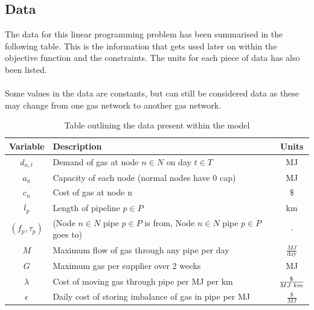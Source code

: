 \documentclass{article}
\begin{document}
\subsection{Data}
\bigskip
The data for this linear programming problem has been summarised in the following table. This is the information that gets used later on within the objective function and the constraints. The units for each piece of data has also been listed. \\
\\
Some values in the data are constants, but can still be considered data as these may change from one gas network to another gas network.
\bigskip
\renewcommand\baselinestretch{1.5}
\begin{table}[h]
    \centering
    \color{black}
        \begin{tabular}{|c:l:c|}
        \hline
        \textbf{Variable} & \textbf{Description} & \textbf{Units} \\
        \hline
        \(d_{n,t}\) & Demand of gas at node \(n\in N\) on day \(t \in T\) & MJ \\ \hdashline
        \(a_n\) & Capacity of each node (normal nodes have 0 cap) & MJ \\ \hdashline
        \(c_n\) & Cost of gas at node n & \(\$\) \\ \hdashline
        \(l_p\) & Length of pipeline \(p\in P\) & km \\ \hdashline
        \((f_p, \tau_p)\) & (Node \(n\in N\) pipe \(p \in P\) is from, Node \(n \in N\) pipe \(p \in P\) goes to) & \(\cdot\) \\ \hdashline
        \(M\) & Maximum flow of gas through any pipe per day & \(\frac{MJ}{\text{day}}\) \\ \hdashline
        \(G\) & Maximum gas per supplier over 2 weeks & MJ \\ \hdashline
        \(\lambda\) & Cost of moving gas through pipe per MJ per km & \(\frac{\$}{MJ\hspace{0.1cm} km}\) \\ \hdashline
        \(\epsilon\) & Daily cost of storing imbalance of gas in pipe per MJ & \(\frac{\$}{MJ}\) \\
        \hline
    \end{tabular}
    \caption{Table outlining the data present within the model}
    \label{tab:data}
\end{table}
\renewcommand\baselinestretch{1}
\bigskip
\newpage
\end{document}
